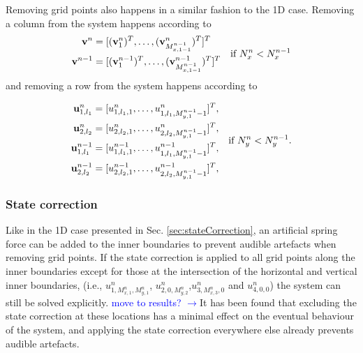 \documentclass[fleqn]{jaes}
\def\SWcomment[#1]{\textcolor{blue}{#1}}
\begin{document}
Removing grid points also happens in a similar fashion to the 1D case. Removing a column from the system happens according to 
\begin{equation}
\begin{aligned}
    \v^n &= [(\v_1^n)^T, \hdots, (\v_{M_{x,1-1}^{n-1}}^n)^T]^T\\
    \v^{n-1} &= [(\v_1^{n-1})^T, \hdots, (\v_{M_{x,1-1}^{n-1}}^{n-1})^T]^T
    \end{aligned}
\quad \text{if } N_x^n < N_x^{n-1}
\end{equation}
and removing a row from the system happens according to

\begin{equation}
    \begin{aligned}
        \u_{1,l_1}^n &= [u_{1,l_1, 1}^n, \hdots, u_{1,l_1, M_{y,1}^{n-1}-1}^n]^T,\\
        \u_{2,l_2}^n &= [u_{2,l_2, 1}^n,\hdots, u^n_{2,l_2, M_{y, 1}^{n-1}-1}]^T,\\
        \u_{1,l_1}^{n-1} &= [u_{1,l_1, 1}^{n-1}, \hdots, u_{1,l_1, M_{y,1}^{n-1}-1}^{n-1}]^T,\\
        \u_{2,l_2}^{n-1} &= [u_{2,l_2, 1}^{n-1},\hdots, u^{n-1}_{2,l_2, M_{y, 1}^{n-1}-1}]^T,
    \end{aligned}\quad \text{if } N_y^n < N_y^{n-1}.
\end{equation}
\subsubsection{State correction}
Like in the 1D case presented in Sec. \ref{sec:stateCorrection}, an artificial spring force can be added to the inner boundaries to prevent audible artefacts when removing grid points. If the state correction is applied to all grid points along the inner boundaries except for those at the intersection of the horizontal and vertical inner boundaries, (i.e., $u_{1, M_{x,1}^n, M_{y,1}^n}^n$, $u_{2, 0, M_{y,2}^n}^n$,$u_{3, M_{x,3}^n, 0}^n$ and $u_{4, 0, 0}^n$) the system can still be solved explicitly. \SWcomment[move to results? $\rightarrow$]It has been found that excluding the state correction at these locations has a minimal effect on the eventual behaviour of the system, and applying the state correction everywhere else already prevents audible artefacts.  
\end{document}
